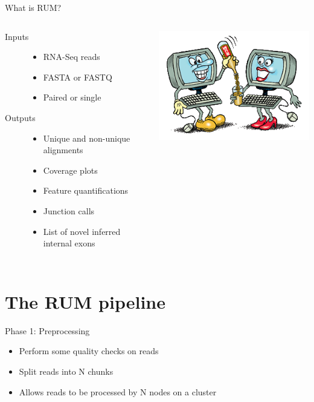 \documentclass{beamer}
\begin{document}
\begin{frame}{What is RUM?}
  \begin{columns}
    \column{3in}
    \begin{description}
    \item [Inputs]
      \begin{itemize}
      \item RNA-Seq reads
      \item FASTA or FASTQ
      \item Paired or single
      \end{itemize}
    \item [Outputs]
      \begin{itemize}
      \item Unique and non-unique alignments
      \item Coverage plots
      \item Feature quantifications
      \item Junction calls
      \item List of novel inferred internal exons
      \end{itemize}
    \end{description}
    \column{2.5in}
    \includegraphics[scale=0.4]{rumpouring2.png}
  \end{columns}
\end{frame}


\section{The RUM pipeline}

\begin{frame}{Phase 1: Preprocessing}

  \begin{itemize}
  \item Perform some quality checks on reads
  \item Split reads into N chunks
  \item Allows reads to be processed by N nodes on a cluster
  \end{itemize}

\end{frame}
\end{document}
